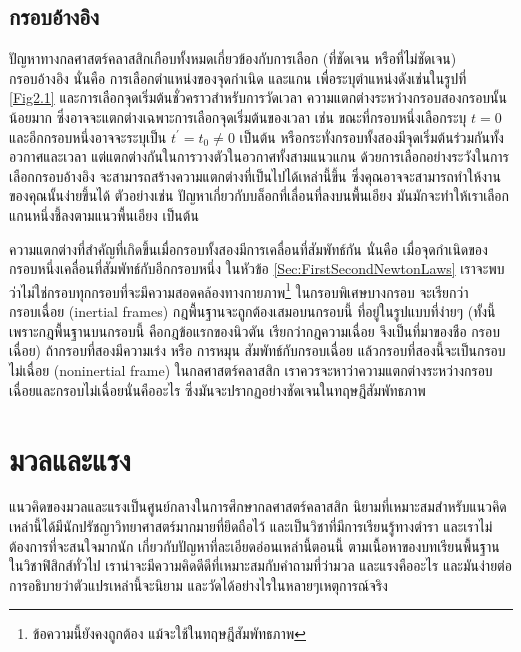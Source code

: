 \subsection{กรอบอ้างอิง}
\label{SubSec:ReferenceFrames}

ปัญหาทางกลศาสตร์คลาสสิกเกือบทั้งหมดเกี่ยวข้องกับการเลือก (ที่ชัดเจน หรือที่ไม่ชัดเจน) $\textit{กรอบอ้างอิง}$ นั่นคือ การเลือกตำแหน่งของจุดกำเนิด และแกน เพื่อระบุตำแหน่งดังเช่นในรูปที่ \ref{Fig2.1} และการเลือกจุดเริ่มต้นชั่วคราวสำหรับการวัดเวลา ความแตกต่างระหว่างกรอบสองกรอบนั้นน้อยมาก ซึ่งอาจจะแตกต่างเฉพาะการเลือกจุดเริ่มต้นของเวลา เช่น ขณะที่กรอบหนึ่งเลือกระบุ $t = 0$ และอีกกรอบหนึ่งอาจจะระบุเป็น $t^\prime = t_0 \neq 0$ เป็นต้น หรือกระทั่งกรอบทั้งสองมีจุดเริ่มต้นร่วมกันทั้งอวกาศและเวลา แต่แตกต่างกันในการวางตัวในอวกาศทั้งสามแนวแกน ด้วยการเลือกอย่างระวังในการเลือกกรอบอ้างอิง จะสามารถสร้างความแตกต่างที่เป็นไปได้เหล่านี้ขึ้น ซึ่งคุณอาจจะสามารถทำให้งานของคุณนั้นง่ายขึ้นได้ ตัวอย่างเช่น ปัญหาเกี่ยวกับบล็อกที่เลื่อนที่ลงบนพื้นเอียง มันมักจะทำให้เราเลือกแกนหนึ่งชี้ลงตามแนวพื้นเอียง เป็นต้น

ความแตกต่างที่สำคัญที่เกิดขึ้นเมื่อกรอบทั้งสองมีการเคลื่อนที่สัมพัทธ์กัน นั่นคือ เมื่อจุดกำเนิดของกรอบหนึ่งเคลื่อนที่สัมพัทธ์กับอีกกรอบหนึ่ง ในหัวข้อ \ref{Sec:FirstSecondNewtonLaws} เราจะพบว่าไม่ใช่กรอบทุกกรอบที่จะมีความสอดคล้องทางกายภาพ\footnote{ข้อความนี้ยังคงถูกต้อง แม้จะใช้ในทฤษฎีสัมพัทธภาพ} ในกรอบพิเศษบางกรอบ จะเรียกว่า $\textbf{กรอบเฉื่อย}$ (inertial frames) กฎพื้นฐานจะถูกต้องเสมอบนกรอบนี้ ที่อยู่ในรูปแบบที่ง่ายๆ (ทั้งนี้เพราะกฎพื้นฐานบนกรอบนี้ คือกฎข้อแรกของนิวตัน เรียกว่ากฎความเฉื่อย จึงเป็นที่มาของชือ กรอบเฉื่อย) ถ้ากรอบที่สองมี$\textit{ความเร่ง}$ หรือ $\textit{การหมุน}$ สัมพัทธ์กับกรอบเฉื่อย แล้วกรอบที่สองนี้จะเป็นกรอบไม่เฉื่อย (noninertial frame) ในกลศาสตร์คลาสสิก เราควรจะหาว่าความแตกต่างระหว่างกรอบเฉื่อยและกรอบไม่เฉื่อยนั่นคืออะไร ซึ่งมันจะปรากฏอย่างชัดเจนในทฤษฎีสัมพัทธภาพ

\section{มวลและแรง}
\label{Sec:MassAndForce}

แนวคิดของมวลและแรงเป็นศูนย์กลางในการศึกษากลศาสตร์คลาสสิก นิยามที่เหมาะสมสำหรับแนวคิดเหล่านี้ได้มีนักปรัชญาวิทยาศาสตร์มากมายที่ยึดถือไว้ และเป็นวิชาที่มีการเรียนรู้ทางตำรา และเราไม่ต้องการที่จะสนใจมากนัก เกี่ยวกับปัญหาที่ละเอียดอ่อนเหล่านี้ตอนนี้ ตามเนื้อหาของบทเรียนพื้นฐานในวิชาฟิสิกส์ทั่วไป เราน่าจะมีความคิดดีดีที่เหมาะสมกับคำถามที่ว่ามวล และแรงคืออะไร และมันง่ายต่อการอธิบายว่าตัวแปรเหล่านี้จะนิยาม และวัดได้อย่างไรในหลายๆเหตุการณ์จริง

